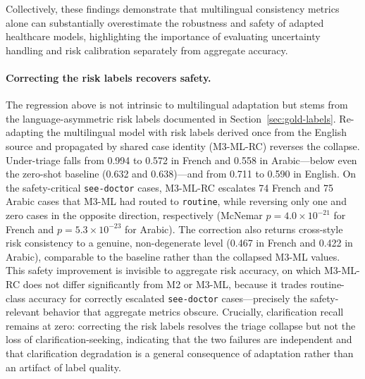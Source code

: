 Collectively, these findings demonstrate that multilingual consistency metrics alone can substantially overestimate the robustness and safety of adapted healthcare models, highlighting the importance of evaluating uncertainty handling and risk calibration separately from aggregate accuracy.

\paragraph{Correcting the risk labels recovers safety.}
The regression above is not intrinsic to multilingual adaptation but stems from the language-asymmetric risk labels documented in Section~\ref{sec:gold-labels}. Re-adapting the multilingual model with risk labels derived once from the English source and propagated by shared case identity (M3-ML-RC) reverses the collapse. Under-triage falls from 0.994 to 0.572 in French and 0.558 in Arabic---below even the zero-shot baseline (0.632 and 0.638)---and from 0.711 to 0.590 in English. On the safety-critical \texttt{see-doctor} cases, M3-ML-RC escalates 74 French and 75 Arabic cases that M3-ML had routed to \texttt{routine}, while reversing only one and zero cases in the opposite direction, respectively (McNemar $p=4.0\times10^{-21}$ for French and $p=5.3\times10^{-23}$ for Arabic). The correction also returns cross-style risk consistency to a genuine, non-degenerate level (0.467 in French and 0.422 in Arabic), comparable to the baseline rather than the collapsed M3-ML values. This safety improvement is invisible to aggregate risk accuracy, on which M3-ML-RC does not differ significantly from M2 or M3-ML, because it trades routine-class accuracy for correctly escalated \texttt{see-doctor} cases---precisely the safety-relevant behavior that aggregate metrics obscure. Crucially, clarification recall remains at zero: correcting the risk labels resolves the triage collapse but not the loss of clarification-seeking, indicating that the two failures are independent and that clarification degradation is a general consequence of adaptation rather than an artifact of label quality.

